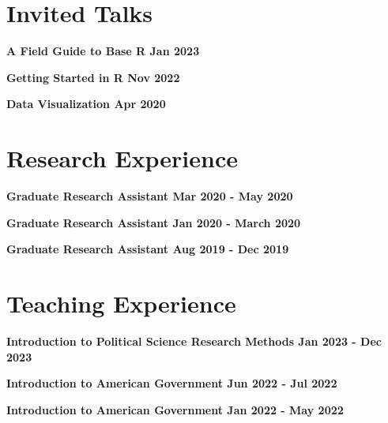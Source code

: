 \documentclass[margin]{res}
\newcommand{\fullhrulefill}{%
  \hspace*{-\sectionwidth}\hrulefill%
  }
\begin{document}
\begin{resume}
\section{Invited Talks}

\textbf{A Field Guide to Base R \hfill{Jan 2023} \\}

\textbf{Getting Started in R \hfill{Nov 2022} \\}

\textbf{Data Visualization \hfill{Apr 2020} \\}


\fullhrulefill
\section{ Research Experience}

\textbf {Graduate Research Assistant \hfill {Mar 2020 - May 2020} \\ }

\textbf {Graduate Research Assistant \hfill {Jan 2020 - March 2020} \\ }

\textbf {Graduate Research Assistant \hfill {Aug 2019 - Dec 2019} \\ }


\fullhrulefill

\section {Teaching Experience}

\textbf {Introduction to Political Science Research Methods \hfill {Jan 2023 - Dec 2023} \\ }

\textbf {Introduction to American Government \hfill {Jun 2022 - Jul 2022} \\ }

\textbf {Introduction to American Government \hfill {Jan 2022 - May 2022} \\ }



\end{resume}
\end{document}
